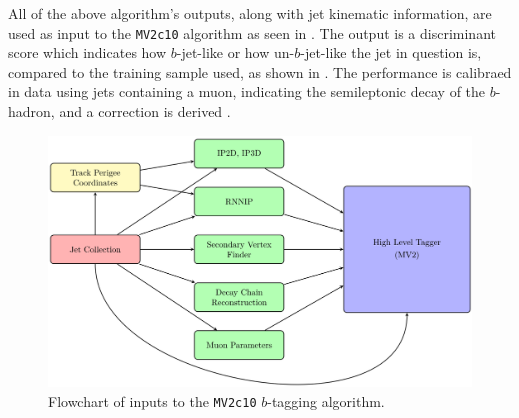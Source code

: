 All of the above algorithm's outputs, along with jet kinematic information, are
used as input to the \texttt{MV2c10} algorithm as seen in
.  The output is a discriminant score which
indicates how $b$-jet-like or how un-$b$-jet-like the jet in question is,
compared to the training sample used, as shown in
.  The performance is calibraed in data using
jets containing a muon, indicating the semileptonic decay of the $b$-hadron,
and a correction is derived \cite{Aaboud:2018xwy}.

\begin{figure}[!htbp]
  \centering
  \includegraphics[width=0.8\linewidth]{figures/objects/BDT_flowchart}
  \caption{\cite{Feickert:ML4Jets2018} Flowchart of inputs to the \texttt{MV2c10} $b$-tagging algorithm.}
  \label{sec:objects:BDT_flowchart}
\end{figure}

